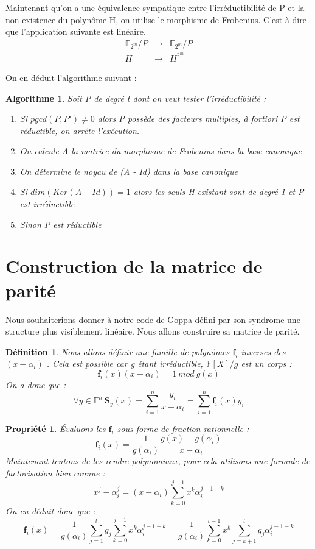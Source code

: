 \documentclass{article}
\newtheorem{prop}{Propriété}
\newtheorem{algo}{Algorithme}
\newtheorem{defi}{Définition}
\begin{document}
		Maintenant qu'on a une équivalence sympatique entre l'irréductibilité de P et la non existence du polynôme H, on utilise le morphisme de Frobenius.
		C'est à dire que l'application suivante est linéaire.
		\begin{eqnarray*}
			\mathbb{F}_{2^{m}}/P &\rightarrow& \mathbb{F}_{2^{m}}/P \\
			H &\rightarrow& H^{2^{m}}
		\end{eqnarray*}

		On en déduit l'algorithme suivant :
		\begin{algo}
			Soit P de degré t dont on veut tester l'irréductibilité :
			\begin{enumerate}
				\item Si $pgcd(P,P') \neq 0$ alors P possède des facteurs multiples, à fortiori P est réductible, on arrête l’exécution.
				\item On calcule A la matrice du morphisme de Frobenius dans la base canonique
				\item On détermine le noyau de (A - Id) dans la base canonique
				\item Si $dim(Ker(A-Id)) = 1$ alors les seuls H existant sont de degré 1 et P est irréductible
				\item Sinon P est réductible
			\end{enumerate}
		\end{algo}

	\section{Construction de la matrice de parité}
		\label{parite}
		\cite{04cc}
		Nous souhaiterions donner à notre code de Goppa défini par son syndrome une structure plus visiblement linéaire. Nous allons construire sa matrice de parité.

		\begin{defi}
			Nous allons définir une famille de polynômes  $ \mathbf{f}_{i} $  inverses des  $ (x-\alpha_{i}) $ . Cela est possible car g étant irréductible,  $ \mathbb{F}[X]/g $  est un corps :
			 $$  \mathbf{f}_{i}(x)(x-\alpha_{i}) = 1 \ mod \ g(x) $$ 
			On a donc que :
			 $$ \forall y \in \mathbb{F}^{n} \ \mathbf{S}_{y}(x) = \sum_{i=1}^{n} \frac{y_{i}}{x-\alpha_{i}} = \sum_{i=1}^{n} \mathbf{f}_{i}(x)y_{i}  $$ 
		\end{defi}

		\begin{prop}
			Évaluons les  $ \mathbf{f}_{i} $  sous forme de fraction rationnelle :
			$$ \mathbf{f}_{i}(x) = \frac{1}{g(\alpha_{i})} \frac{g(x)-g(\alpha_{i})}{x-\alpha_{i}}  $$ 
			Maintenant tentons de les rendre polynomiaux, pour cela utilisons une formule de factorisation bien connue  :
			$$ x^{j} - \alpha_{i}^{j} = (x-\alpha_{i})\sum_{k=0}^{j-1} x^{k}\alpha_{i}^{j-1-k}$$
			On en déduit donc que :
			$$  \mathbf{f}_{i}(x) = \frac{1}{g(\alpha_{i})} \sum_{j=1}^{t} g_{j}\sum_{k=0}^{j-1} x^{k}\alpha_{i}^{j-1-k} 
			= \frac{1}{g(\alpha_{i})} \sum_{k=0}^{t-1} x^{k}\sum_{j=k+1}^{t} g_{j}\alpha_{i}^{j-1-k}$$
		\end{prop}
\end{document}

